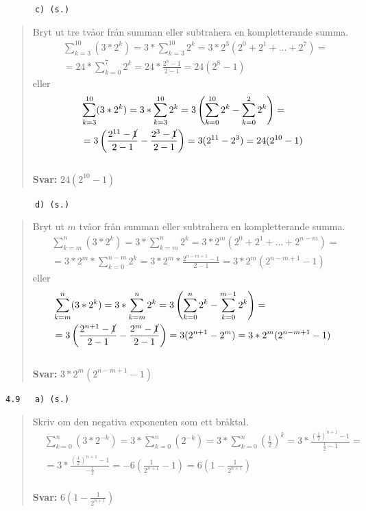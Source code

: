 \documentclass[a4paper]{article}
\newcommand{\tskcol}[1]{\textcolor{tskcol}{#1}}
\begin{document}
	\texttt{\tskcol{~~~~~~c) (s.)}}
	\begin{quotation}
		\noindent
		Bryt ut tre tvåor från summan eller subtrahera en kompletterande summa. 
		\begin{align*}
		&\sum_{k=3}^{10}(3*2^k)=
		3*\sum_{k=3}^{10}2^k=
		3*2^3(2^0+2^1+\ldots+2^7)= \\
		&=24*\sum_{k=0}^{7}2^k=
		24*\frac{2^{8}-1}{2-1}=
		24(2^{8}-1)
		\end{align*}
		eller
		\begin{align*}
		&\sum_{k=3}^{10}(3*2^k)=
		3*\sum_{k=3}^{10}2^k=
		3\left(\sum_{k=0}^{10}2^k-\sum_{k=0}^{2}2^k\right)= \\
		&=3\left(\frac{2^{11}-\cancel{1}}{2-1}-\frac{2^3-\cancel{1}}{2-1}\right)=
		3(2^{11}-2^3)=
		24(2^{10}-1)
		\end{align*}
		\\
		\textbf{Svar:} $24(2^{10}-1)$
	\end{quotation}
	
	\pagebreak
	\texttt{\tskcol{~~~~~~d) (s.)}}
	\begin{quotation}
		\noindent
		Bryt ut $m$ tvåor från summan eller subtrahera en kompletterande summa. 
		\begin{align*}
		&\sum_{k=m}^{n}(3*2^k)=
		3*\sum_{k=m}^{n}2^k=
		3*2^m(2^0+2^1+\ldots+2^{n-m})= \\
		&=3*2^m*\sum_{k=0}^{n-m}2^k=
		3*2^m*\frac{2^{n-m+1}-1}{2-1}=
		3*2^m(2^{n-m+1}-1)
		\end{align*}
		eller
		\begin{align*}
		&\sum_{k=m}^{n}(3*2^k)=
		3*\sum_{k=m}^{n}2^k=
		3\left(\sum_{k=0}^{n}2^k-\sum_{k=0}^{m-1}2^k\right)= \\
		&=3\left(\frac{2^{n+1}-\cancel{1}}{2-1}-\frac{2^{m}-\cancel{1}}{2-1}\right)=
		3(2^{n+1}-2^m)=
		3*2^m(2^{n-m+1}-1)
		\end{align*}
		\\
		\textbf{Svar:} $3*2^m(2^{n-m+1}-1)$
	\end{quotation}
	
	\texttt{\tskcol{4.9~~~a) (s.)}}
	\begin{quotation}
		\noindent
		Skriv om den negativa exponenten som ett bråktal.
		\begin{align*}
		&\sum_{k=0}^{n}(3*2^{-k})=
		3*\sum_{k=0}^{n}(2^{-k})=
		3*\sum_{k=0}^{n}\left(\tfrac{1}{2}\right)^{k}=
		3*\frac{(\frac{1}{2})^{n+1}-1}{\frac{1}{2}-1}= \\
		&=3*\frac{(\frac{1}{2})^{n+1}-1}{-\frac{1}{2}}=
		-6\left(\frac{1}{2^{n+1}}-1\right)=
		6\left(1-\frac{1}{2^{n+1}}\right)
		\end{align*}
		\\
		\textbf{Svar:} $6\left(1-\frac{1}{2^{n+1}}\right)$
	\end{quotation}
	
\end{document}
